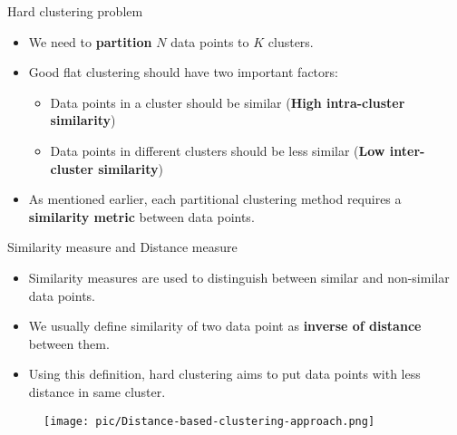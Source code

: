 \documentclass[serif, aspectratio=169]{beamer}
\begin{document}
\begin{frame}{Hard clustering problem}
    \begin{itemize}
        \item We need to \textbf{partition} \( N \) data points to \( K \) clusters.
        \item Good flat clustering should have two important factors:
        \begin{itemize}
            \item Data points in a cluster should be similar (\textbf{High intra-cluster similarity})
            \item Data points in different clusters should be less similar (\textbf{Low inter-cluster similarity})
        \end{itemize}
        \item As mentioned earlier, each partitional clustering method requires a \textbf{similarity metric} between data points.
    \end{itemize}
\end{frame}

\begin{frame}{Similarity measure and Distance measure}
    \begin{minipage}{0.6\textwidth}
        \begin{itemize}
            \item Similarity measures are used to distinguish between similar and non-similar data points.
            \item We usually define similarity of two data point as \textbf{inverse of distance} between them.
            \item Using this definition, {hard clustering aims to put data points with less distance in same cluster.}
        \end{itemize}
    \end{minipage}%
    \begin{minipage}{0.35}
        \begin{figure}
            \centering
            \texttt{[image: pic/Distance-based-clustering-approach.png]}
        \end{figure}
    \end{minipage}
\end{frame}
\end{document}
